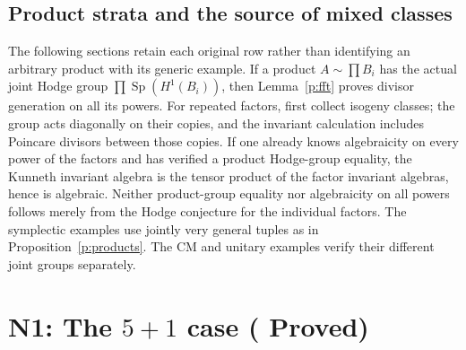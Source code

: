 \documentclass[10pt,reqno]{article}
\theoremstyle{emphasizedplain}
\DeclareRobustCommand{\provedstatus}{%
  \texorpdfstring{\textcolor{ProvedGreen}{\textbf{Proved}}}{Proved}}
\theoremstyle{emphasizeddefinition}
\theoremstyle{emphasizeddefinition}
\DeclareMathOperator{\Sp}{Sp}
\begin{document}
\subsection*{Product strata and the source of mixed classes}
The following sections retain each original row rather than identifying
an arbitrary product with its generic example. If a product $A\sim\prod B_i$
has the actual joint Hodge group $\prod\Sp(H^1(B_i))$, then
Lemma~\ref{p:fft} proves divisor generation on all its powers.
For repeated factors, first collect isogeny classes; the group acts
diagonally on their copies, and the invariant calculation includes
Poincare divisors between those copies.
If one already knows algebraicity on every power of the factors and
has verified a product Hodge-group equality, the Kunneth invariant
algebra is the tensor product of the factor invariant algebras, hence
is algebraic. Neither product-group equality nor algebraicity on all
powers follows merely from the Hodge conjecture for the individual factors.
The symplectic examples use jointly very general tuples as in
Proposition~\ref{p:products}. The CM and unitary examples verify their
different joint groups separately.
\section{N1: The \texorpdfstring{$5+1$}{5+1} case (\provedstatus)}\label{sec:N1}
\end{document}
